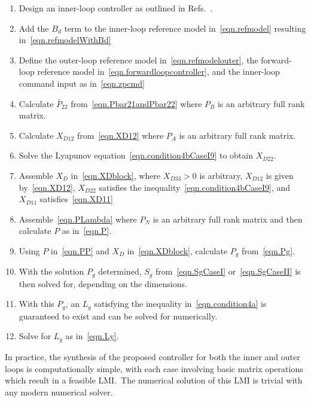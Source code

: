 \documentclass[journal]{IEEEtran}
\theoremstyle{innercustomthm}
\begin{document}
  \begin{enumerate}[1.]
    \setlength{\itemsep}{0pt}
    \item{Design an inner-loop controller as outlined in Refs.\ \cite{wiese.gnc.2015, wiese.jgcd.2015}.}
    \item{Add the $B_{d}$ term to the inner-loop reference model in\ \eqref{eqn.refmodel} resulting in\ \eqref{eqn.refmodelWithBd}}
    \item{Define the outer-loop reference model in\ \eqref{eqn.refmodelouter}, the forward-loop reference model in\ \eqref{eqn.forwardloopcontroller}, and the inner-loop command input as in\ \eqref{eqn.zpcmd}}
    \item{Calculate $\bar{P}_{22}$ from\ \eqref{eqn.Pbar21andPbar22} where $P_{B}$ is an arbitrary full rank matrix.}
    \item{Calculate $X_{D12}$ from\ \eqref{eqn.XD12} where $P_{A}$ is an arbitrary full rank matrix.}
    \item{Solve the Lyapunov equation\ \eqref{eqn.condition4bCaseI9} to obtain $X_{D22}$.}
    \item{Assemble $X_{D}$ in\ \eqref{eqn.XDblock}, where $X_{D33}>0$ is arbitrary, $X_{D12}$ is given by\ \eqref{eqn.XD12}, $X_{D22}$ satisfies the inequality\ \eqref{eqn.condition4bCaseI9}, and $X_{D11}$ satisfies\ \eqref{eqn.XD11}}
    \item{Assemble\ \eqref{eqn.PLambda} where $P_{N}$ is an arbitrary full rank matrix and then calculate $P$ as in\ \eqref{eqn.P}.}
    \item{Using $P$ in\ \eqref{eqn.PP} and $X_{D}$ in\ \eqref{eqn.XDblock},  calculate $P_{g}$ from\ \eqref{eqn.Pg}.}
    \item{With the solution $P_{g}$ determined, $S_{g}$ from\ \eqref{eqn.SgCaseI} or\ \eqref{eqn.SgCaseII} is then solved for, depending on the dimensions.}
    \item{With this $P_{g}$, an $L_{g}$ satisfying the inequality in\ \eqref{eqn.condition4a} is guaranteed to exist and can be solved for numerically.}
    \item{Solve for $L_{y}$ as in\ \eqref{eqn.Ly}.}
  \end{enumerate}

  \begin{rem-dan}
    In practice, the synthesis of the proposed controller for both the inner and outer loops is computationally simple, with each case involving basic matrix operations which result in a feasible LMI.\
    The numerical solution of this LMI is trivial with any modern numerical solver.
  \end{rem-dan}
\end{document}
